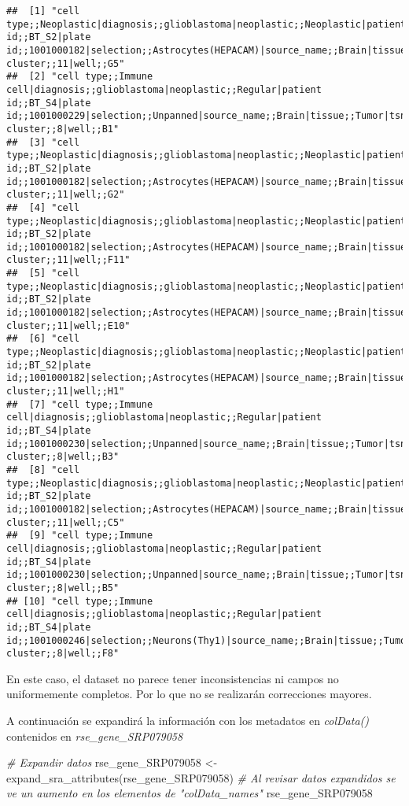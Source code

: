 \documentclass[
]{article}
\newenvironment{Shaded}{\begin{snugshade}}{\end{snugshade}}
\newcommand{\CommentTok}[1]{\textcolor[rgb]{0.56,0.35,0.01}{\textit{#1}}}
\newcommand{\FunctionTok}[1]{\textcolor[rgb]{0.00,0.00,0.00}{#1}}
\newcommand{\NormalTok}[1]{#1}
\newcommand{\OtherTok}[1]{\textcolor[rgb]{0.56,0.35,0.01}{#1}}
\begin{document}
\begin{verbatim}
##  [1] "cell type;;Neoplastic|diagnosis;;glioblastoma|neoplastic;;Neoplastic|patient id;;BT_S2|plate id;;1001000182|selection;;Astrocytes(HEPACAM)|source_name;;Brain|tissue;;Tumor|tsne cluster;;11|well;;G5" 
##  [2] "cell type;;Immune cell|diagnosis;;glioblastoma|neoplastic;;Regular|patient id;;BT_S4|plate id;;1001000229|selection;;Unpanned|source_name;;Brain|tissue;;Tumor|tsne cluster;;8|well;;B1"               
##  [3] "cell type;;Neoplastic|diagnosis;;glioblastoma|neoplastic;;Neoplastic|patient id;;BT_S2|plate id;;1001000182|selection;;Astrocytes(HEPACAM)|source_name;;Brain|tissue;;Tumor|tsne cluster;;11|well;;G2" 
##  [4] "cell type;;Neoplastic|diagnosis;;glioblastoma|neoplastic;;Neoplastic|patient id;;BT_S2|plate id;;1001000182|selection;;Astrocytes(HEPACAM)|source_name;;Brain|tissue;;Tumor|tsne cluster;;11|well;;F11"
##  [5] "cell type;;Neoplastic|diagnosis;;glioblastoma|neoplastic;;Neoplastic|patient id;;BT_S2|plate id;;1001000182|selection;;Astrocytes(HEPACAM)|source_name;;Brain|tissue;;Tumor|tsne cluster;;11|well;;E10"
##  [6] "cell type;;Neoplastic|diagnosis;;glioblastoma|neoplastic;;Neoplastic|patient id;;BT_S2|plate id;;1001000182|selection;;Astrocytes(HEPACAM)|source_name;;Brain|tissue;;Tumor|tsne cluster;;11|well;;H1" 
##  [7] "cell type;;Immune cell|diagnosis;;glioblastoma|neoplastic;;Regular|patient id;;BT_S4|plate id;;1001000230|selection;;Unpanned|source_name;;Brain|tissue;;Tumor|tsne cluster;;8|well;;B3"               
##  [8] "cell type;;Neoplastic|diagnosis;;glioblastoma|neoplastic;;Neoplastic|patient id;;BT_S2|plate id;;1001000182|selection;;Astrocytes(HEPACAM)|source_name;;Brain|tissue;;Tumor|tsne cluster;;11|well;;C5" 
##  [9] "cell type;;Immune cell|diagnosis;;glioblastoma|neoplastic;;Regular|patient id;;BT_S4|plate id;;1001000230|selection;;Unpanned|source_name;;Brain|tissue;;Tumor|tsne cluster;;8|well;;B5"               
## [10] "cell type;;Immune cell|diagnosis;;glioblastoma|neoplastic;;Regular|patient id;;BT_S4|plate id;;1001000246|selection;;Neurons(Thy1)|source_name;;Brain|tissue;;Tumor|tsne cluster;;8|well;;F8"
\end{verbatim}

En este caso, el dataset no parece tener inconsistencias ni campos no
uniformemente completos. Por lo que no se realizarán correcciones
mayores.

A continuación se expandirá la información con los metadatos en
\emph{colData()} contenidos en \emph{rse\_gene\_SRP079058}

\begin{Shaded}
\begin{Highlighting}[]
\CommentTok{\# Expandir datos}
\NormalTok{rse\_gene\_SRP079058 }\OtherTok{\textless{}{-}} \FunctionTok{expand\_sra\_attributes}\NormalTok{(rse\_gene\_SRP079058)}
\CommentTok{\# Al revisar datos expandidos se ve un aumento en los elementos de "colData\_names"}
\NormalTok{rse\_gene\_SRP079058}
\end{Highlighting}
\end{Shaded}
\end{document}
